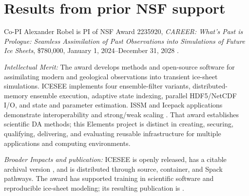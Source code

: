 \section{Results from prior NSF support}

Co-PI Alexander Robel is PI of NSF Award 2235920,
\textit{CAREER: What's Past is Prologue: Seamless Assimilation of Past
Observations into Simulations of Future Ice Sheets}, \$780,000, January 1,
2024--December 31, 2028 \citep{nsf2235920}.

\textit{Intellectual Merit:} The award develops methods and open-source
software for assimilating modern and geological observations into transient
ice-sheet simulations. ICESEE implements four ensemble-filter variants,
distributed-memory ensemble execution, adaptive state indexing, parallel
HDF5/NetCDF I/O, and state and parameter estimation. ISSM and Icepack
applications demonstrate interoperability and strong/weak scaling
\citep{kyanjo2026icesee}. That award establishes scientific DA methods; this
Elements project is distinct in creating, securing, qualifying, delivering,
and evaluating reusable infrastructure for multiple applications and
computing environments.

\textit{Broader Impacts and publication:} ICESEE is openly released, has a
citable archival version \citep{kyanjo2026zenodo}, and is distributed through
source, container, and Spack pathways. The award has supported training in
scientific software and reproducible ice-sheet modeling; its resulting
publication is \cite{kyanjo2026icesee}.
